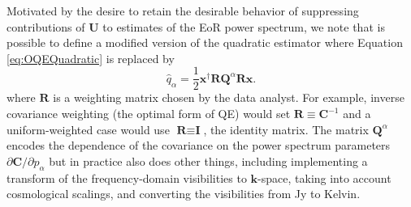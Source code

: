 \documentclass[preprint2,numberedappendix,tighten]{aastex6}  %
\newcommand{\C}{\mathbf{C}}
\begin{document}
Motivated by the desire to retain the desirable behavior of suppressing contributions of $\mathbf{U}$ to estimates of the EoR power spectrum, we note that is possible to define a modified version of the quadratic estimator 
where Equation \eqref{eq:OQEQuadratic} is replaced by
\begin{equation}
\label{eq:qhat}
\widehat{q}_{\alpha} = \frac{1}{2}\textbf{x}^{\dagger}\textbf{R}\textbf{Q}^{\alpha}\textbf{R}\textbf{x}.
\end{equation}
where $\textbf{R}$ is a weighting matrix chosen by the data analyst.  For example, inverse covariance weighting (the optimal form of QE) would set $\textbf{R} \equiv \textbf{C}^{-1}$ and a uniform-weighted case would use $\textbf{R} \equiv \textbf{I}$, the identity matrix.
The matrix $\textbf{Q}^{\alpha}$ encodes the dependence of the covariance on the power spectrum parameters $\partial \C/\partial p_\alpha$ but in practice also does other things, including implementing a transform of the frequency-domain visibilities to $\mathbf{k}$-space, taking into account cosmological scalings, and converting the visibilities from Jy to Kelvin.
\end{document}
